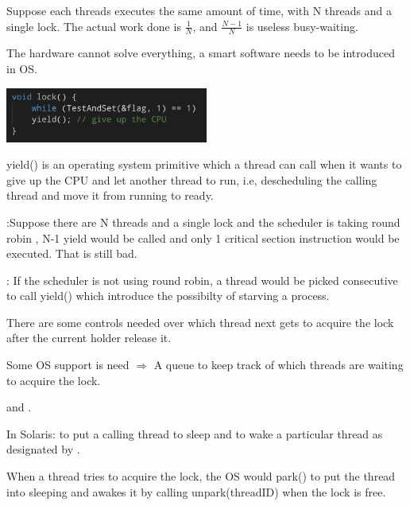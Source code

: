     Suppose each threads executes the same amount of time, with N threads and a single lock. The actual work
    done is $\frac{1}{N}$, and $\frac{N-1}{N}$ is useless busy-waiting.
    
    The hardware cannot solve everything, a smart software needs to be introduced in OS.


    \includegraphics[width=0.5\textwidth]{chapters/Cucurrency/Cucurrency/yield.png}

    yield() is an operating system primitive which a thread can call when it wants to give up the CPU and 
    let another thread to run, i.e, descheduling the calling thread and move it from running to ready.

    
    :Suppose there are N threads and a single lock and the scheduler is taking round robin
    , N-1 yield would be called and only 1 critical section instruction would be executed. That is still 
    bad.

    : If the scheduler is not using round robin, a thread would be picked consecutive to 
    call yield() which introduce the possibilty of starving a process.


    There are some controls needed over which thread next gets to acquire the lock after the current holder release
    it.

    Some OS support is need $\Rightarrow$ A queue to keep track of which threads are waiting to acquire the lock.

    \vspace*{2mm}
   
     and .

    In Solaris:  to put a calling thread to sleep and  to wake a particular
    thread as designated by .

    When a thread tries to acquire the lock, the OS would park() to put the thread into sleeping and awakes it 
    by calling unpark(threadID) when the lock is free.

    
    \vspace*{2mm}
    
